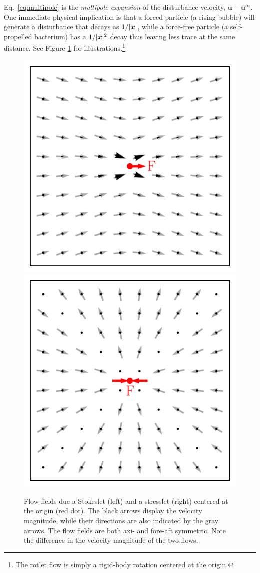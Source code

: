 Eq.\ \eqref{eq:multipole} is the \emph{multipole expansion} of the disturbance velocity, ${\bm u}-{\bm u}^\infty$. One immediate physical implication is that a forced particle (\eg a rising bubble) will generate a disturbance that decays as $1/\lvert\bm x\rvert$, while a force-free particle (\eg a self-propelled bacterium) has a $1/\lvert\bm x\rvert^2$ decay thus leaving less trace at the same distance. See Figure \ref{fig:lets} for illustrations.\footnote{The rotlet flow is simply a rigid-body rotation centered at the origin.}

\begin{figure}%
  \centering
  \includegraphics[width=0.49\columnwidth]{stokeslet1.pdf}
  \includegraphics[width=0.49\columnwidth]{stresslet1.pdf}
  \caption{Flow fields due a Stokeslet (left) and a stresslet (right) centered at the origin (red dot). The black arrows display the velocity magnitude, while their directions are also indicated by the gray arrows. The flow fields are both axi- and fore-aft symmetric. Note the difference in the velocity magnitude of the two flows.}
  \label{fig:lets}
\end{figure}

